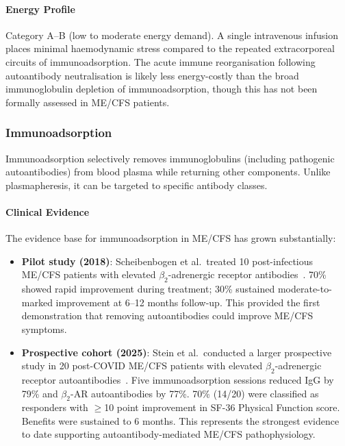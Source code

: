 \paragraph{Energy Profile}
Category A--B (low to moderate energy demand). A single intravenous infusion places minimal haemodynamic stress compared to the repeated extracorporeal circuits of immunoadsorption. The acute immune reorganisation following autoantibody neutralisation is likely less energy-costly than the broad immunoglobulin depletion of immunoadsorption, though this has not been formally assessed in ME/CFS patients.

\subsubsection{Immunoadsorption}

Immunoadsorption selectively removes immunoglobulins (including pathogenic autoantibodies) from blood plasma while returning other components. Unlike plasmapheresis, it can be targeted to specific antibody classes.

\paragraph{Clinical Evidence}
The evidence base for immunoadsorption in ME/CFS has grown substantially:

\begin{itemize}
    \item \textbf{Pilot study (2018)}: Scheibenbogen et al.\ treated 10 post-infectious ME/CFS patients with elevated $\beta_2$-adrenergic receptor antibodies~\cite{Scheibenbogen2018immunoadsorption}. 70\% showed rapid improvement during treatment; 30\% sustained moderate-to-marked improvement at 6--12 months follow-up. This provided the first demonstration that removing autoantibodies could improve ME/CFS symptoms.

    \item \textbf{Prospective cohort (2025)}: Stein et al.\ conducted a larger prospective study in 20 post-COVID ME/CFS patients with elevated $\beta_2$-adrenergic receptor autoantibodies~\cite{Stein2024immunoadsorption}. Five immunoadsorption sessions reduced IgG by 79\% and $\beta_2$-AR autoantibodies by 77\%. 70\% (14/20) were classified as responders with $\geq$10 point improvement in SF-36 Physical Function score. Benefits were sustained to 6 months. This represents the strongest evidence to date supporting autoantibody-mediated ME/CFS pathophysiology.
\end{itemize}

